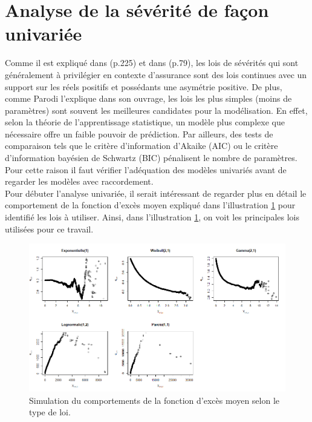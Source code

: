 \section{Analyse de la sévérité de façon univariée}\label{Section_Severite}
	Comme il est expliqué dans \cite{Parodi2015_Pricing_in_GenIns}(p.225) et dans \cite{TheorieDuRisque2018_MarceauEtCossette}(p.79), les lois de sévérités qui sont généralement à privilégier en contexte d'assurance sont des lois continues avec un support sur les réels positifs et possédants une asymétrie positive. De plus, comme Parodi l'explique dans son ouvrage, les lois les plus simples (moins de paramètres) sont souvent les meilleures candidates pour la modélisation. En effet, selon la théorie de l'apprentissage statistique, un modèle plus complexe que nécessaire offre un faible pouvoir de prédiction. Par ailleurs, des tests de comparaison tels que le critère d'information d'Akaike (AIC) ou le critère d'information bayésien de Schwartz (BIC) pénalisent le nombre de paramètres. Pour cette raison il faut vérifier l'adéquation des modèles univariés avant de regarder les modèles avec raccordement.\\
	
	Pour débuter l'analyse univariée, il serait intéressant de regarder plus en détail le comportement de la fonction d'excès moyen expliqué dans l'illustration \ref{Graph_MeanExcess} pour identifié les lois à utiliser. Ainsi, dans l'illustration \ref{Graph_MeanExcess}, on voit les principales lois utilisées pour ce travail.
	
	\begin{figure}[H]
		\begin{center}
		\includegraphics[scale=0.7]{Graphiques/Graph_MeanExcess} 
		\renewcommand{\figurename}{Illustration}
		\caption{Simulation du comportements de la fonction d'excès moyen selon le type de loi.} \label{Graph_MeanExcess}
	\end{center}
	\end{figure}


